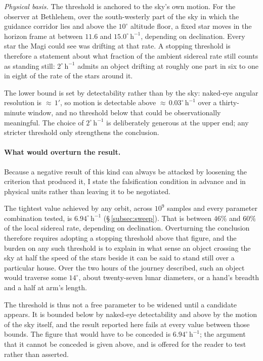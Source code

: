 \documentclass[11pt,a4paper]{article}
\begin{document}
\textit{Physical basis.} The threshold is anchored to the sky's own motion. For
the observer at Bethlehem, over the south-westerly part of the sky in which the
guidance corridor lies and above the $10^\circ$ altitude floor, a fixed star
moves in the horizon frame at between $11.6$ and $15.0^\circ\,\mathrm{h}^{-1}$,
depending on declination. Every star the Magi could see was drifting at that
rate. A stopping threshold is therefore a statement about what fraction of the
ambient sidereal rate still counts as standing still:
$2^\circ\,\mathrm{h}^{-1}$ admits an object drifting at roughly one part in six
to one in eight of the rate of the stars around it.

The lower bound is set by detectability rather than by the sky: naked-eye
angular resolution is ${\approx}\,1'$, so motion is detectable above
${\approx}\,0.03^\circ\,\mathrm{h}^{-1}$ over a thirty-minute window, and no
threshold below that could be observationally meaningful. The choice of
$2^\circ\,\mathrm{h}^{-1}$ is deliberately generous at the upper end; any
stricter threshold only strengthens the conclusion.

\paragraph{What would overturn the result.}
Because a negative result of this kind can always be attacked by loosening the
criterion that produced it, I state the falsification condition in advance and
in physical units rather than leaving it to be negotiated.

The tightest value achieved by any orbit, across $10^9$ samples and every
parameter combination tested, is $6.94^\circ\,\mathrm{h}^{-1}$ (§\,\ref{subsec:sweep}). That
is between $46\%$ and $60\%$ of the local sidereal rate, depending on
declination. Overturning the conclusion therefore requires adopting a stopping
threshold above that figure, and the burden on any such threshold is to explain
in what sense an object crossing the sky at half the speed of the stars beside
it can be said to stand still over a particular house. Over the two hours of
the journey described, such an object would traverse some $14^\circ$, about
twenty-seven lunar diameters, or a hand's breadth and a half at arm's length.

The threshold is thus not a free parameter to be widened until a candidate
appears. It is bounded below by naked-eye detectability and above by the motion
of the sky itself, and the result reported here fails at every value between
those bounds. The figure that would have to be conceded is
$6.94^\circ\,\mathrm{h}^{-1}$; the argument that it cannot be conceded is given
above, and is offered for the reader to test rather than asserted.
\end{document}

